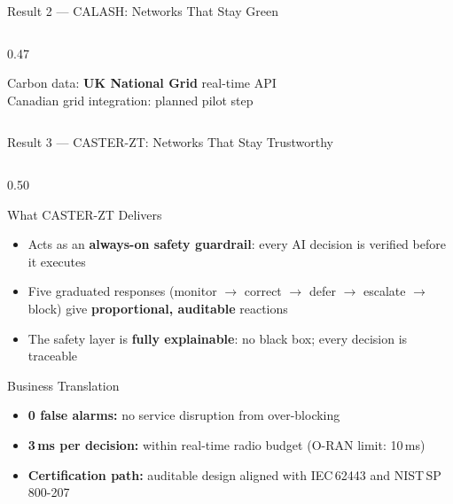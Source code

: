 \documentclass[aspectratio=169,t,10pt]{beamer}
\begin{document}
\begin{frame}[shrink=12]{Result 2 --- CALASH: Networks That Stay Green}
\begin{columns}[T]
\begin{column}{0.47\textwidth}
  \vspace{4pt}
  {\centering\scriptsize\color{gray!70}
    Carbon data: \textbf{UK National Grid} real-time API\\[1pt]
    Canadian grid integration: planned pilot step\par}
\end{column}
\end{columns}
\end{frame}

\begin{frame}[shrink=12]{Result 3 --- CASTER-ZT: Networks That Stay Trustworthy}
\begin{columns}[T]
\begin{column}{0.50\textwidth}
  \begin{block}{\faLock\; What CASTER-ZT Delivers}
    \begin{itemize}\small\setlength{\itemsep}{2pt}
      \item Acts as an \textbf{always-on safety guardrail}:
            every AI decision is verified before it executes
      \item Five graduated responses (monitor $\to$ correct $\to$ defer
            $\to$ escalate $\to$ block) give
            \textbf{proportional, auditable} reactions
      \item The safety layer is \textbf{fully explainable}:
            no black box; every decision is traceable
    \end{itemize}
  \end{block}
  \vspace{1pt}
  \begin{exampleblock}{\faBriefcase\; Business Translation}
    \begin{itemize}\small\setlength{\itemsep}{1pt}
      \item \textbf{0 false alarms:} no service disruption from over-blocking
      \item \textbf{3\,ms per decision:}
            within real-time radio budget (O-RAN limit: 10\,ms)
      \item \textbf{Certification path:} auditable design aligned with
            IEC\,62443 and NIST\,SP\,800-207
    \end{itemize}

\end{exampleblock}
\end{column}
\end{columns}
\end{frame}
\end{document}

